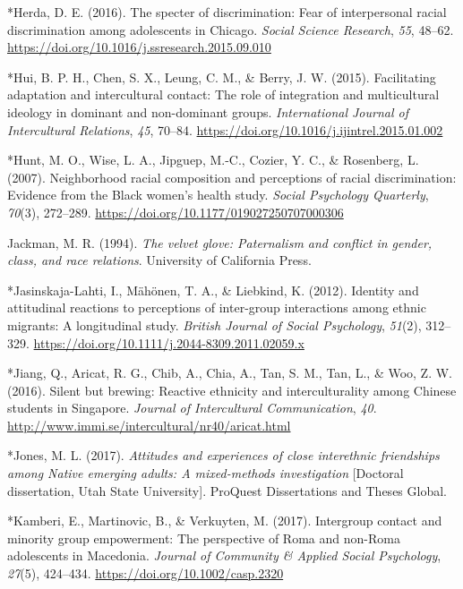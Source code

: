 \documentclass[12pt, letterpaper]{article}
\begin{document}
\leavevmode\hypertarget{ref-324}{}%
*Herda, D. E. (2016). The specter of discrimination: Fear of
interpersonal racial discrimination among adolescents in Chicago.
\emph{Social Science Research}, \emph{55}, 48--62.
\url{https://doi.org/10.1016/j.ssresearch.2015.09.010}

\leavevmode\hypertarget{ref-609}{}%
*Hui, B. P. H., Chen, S. X., Leung, C. M., \& Berry, J. W. (2015).
Facilitating adaptation and intercultural contact: The role of
integration and multicultural ideology in dominant and non-dominant
groups. \emph{International Journal of Intercultural Relations},
\emph{45}, 70--84. \url{https://doi.org/10.1016/j.ijintrel.2015.01.002}

\leavevmode\hypertarget{ref-2001}{}%
*Hunt, M. O., Wise, L. A., Jipguep, M.-C., Cozier, Y. C., \& Rosenberg,
L. (2007). Neighborhood racial composition and perceptions of racial
discrimination: Evidence from the Black women's health study.
\emph{Social Psychology Quarterly}, \emph{70}(3), 272--289.
\url{https://doi.org/10.1177/019027250707000306}

\leavevmode\hypertarget{ref-jackman_velvet_1994}{}%
Jackman, M. R. (1994). \emph{The velvet glove: Paternalism and conflict
in gender, class, and race relations}. University of California Press.

\leavevmode\hypertarget{ref-2341}{}%
*Jasinskaja-Lahti, I., Mähönen, T. A., \& Liebkind, K. (2012). Identity
and attitudinal reactions to perceptions of inter-group interactions
among ethnic migrants: A longitudinal study. \emph{British Journal of
Social Psychology}, \emph{51}(2), 312--329.
\url{https://doi.org/10.1111/j.2044-8309.2011.02059.x}

\leavevmode\hypertarget{ref-19}{}%
*Jiang, Q., Aricat, R. G., Chib, A., Chia, A., Tan, S. M., Tan, L., \&
Woo, Z. W. (2016). Silent but brewing: Reactive ethnicity and
interculturality among Chinese students in Singapore. \emph{Journal of
Intercultural Communication}, \emph{40}.
\url{http://www.immi.se/intercultural/nr40/aricat.html}

\leavevmode\hypertarget{ref-303}{}%
*Jones, M. L. (2017). \emph{Attitudes and experiences of close
interethnic friendships among Native emerging adults: A mixed-methods
investigation} {[}Doctoral dissertation, Utah State University{]}.
ProQuest Dissertations and Theses Global.

\leavevmode\hypertarget{ref-856}{}%
*Kamberi, E., Martinovic, B., \& Verkuyten, M. (2017). Intergroup
contact and minority group empowerment: The perspective of Roma and
non-Roma adolescents in Macedonia. \emph{Journal of Community \& Applied
Social Psychology}, \emph{27}(5), 424--434.
\url{https://doi.org/10.1002/casp.2320}
\end{document}
